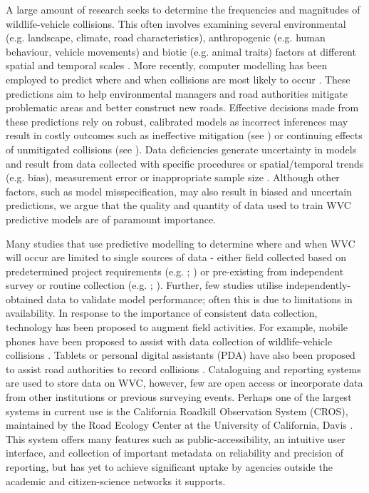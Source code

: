 A large amount of research seeks to determine the frequencies and magnitudes of wildlife-vehicle collisions. This often involves examining several environmental (e.g. landscape, climate, road characteristics), anthropogenic (e.g. human behaviour, vehicle movements) and biotic (e.g. animal traits) factors at different spatial and temporal scales \citep{litv08}. More recently, computer modelling has been employed to predict where and when collisions are most likely to occur \citep{guns11}. These predictions aim to help environmental managers and road authorities mitigate problematic areas and better construct new roads. Effective decisions made from these predictions rely on robust, calibrated models as incorrect inferences may result in costly outcomes such as ineffective mitigation (see \cite{huij09}) or continuing effects of unmitigated collisions (see \cite{biss08b}). Data deficiencies generate uncertainty in models and result from data collected with specific procedures or spatial/temporal trends (e.g. bias), measurement error or inappropriate sample size \citep{bean12}.  Although other factors, such as model misspecification, may also result in biased and uncertain predictions, we argue that the quality and quantity of data used to train WVC predictive models are of paramount importance.

Many studies that use predictive modelling to determine where and when WVC will occur are limited to single sources of data - either field collected based on predetermined project requirements (e.g. \cite{lang09}; \cite{roge09}) or pre-existing from independent survey or routine collection (e.g. \cite{hoth12}; \cite{malo04}). Further, few studies utilise independently-obtained data to validate model performance; often this is due to limitations in availability. In response to the importance of consistent data collection, technology has been proposed to augment field activities. For example, mobile phones have been proposed to assist with data collection of wildlife-vehicle collisions \citep{aane09,olso14}. Tablets or personal digital assistants (PDA) have also been proposed to assist road authorities to record collisions \citep{amen07}. Cataloguing and reporting systems are used to store data on WVC, however, few are open access or incorporate data from other institutions or previous surveying events. Perhaps one of the largest systems in current use is the California Roadkill Observation System (CROS), maintained by the Road Ecology Center at the University of California, Davis \citep{shil15b}. This system offers many features such as public-accessibility, an intuitive user interface, and collection of important metadata on reliability and precision of reporting, but has yet to achieve significant uptake by agencies outside the academic and citizen-science networks it supports.

